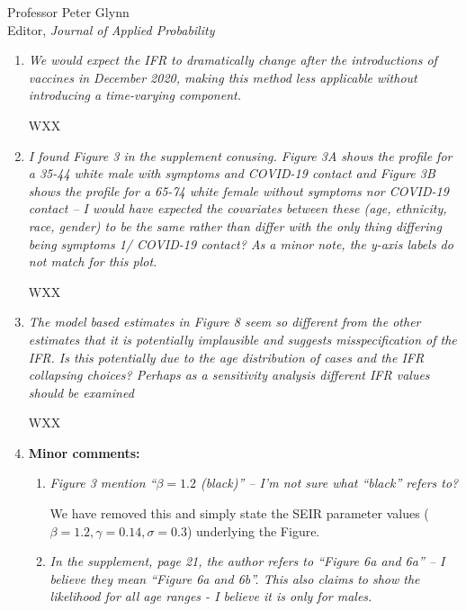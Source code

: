 \documentclass[11pt]{letter} %
\begin{document}
\begin{letter}{Professor
	Peter Glynn\\
	Editor, {\em Journal of Applied Probability}}
\begin{enumerate}
\vspace{5mm}
WXX
\vspace{5mm}
\item {\it We would expect the IFR to dramatically change after the introductions of vaccines in December 2020, making this method less applicable without introducing a time-varying component.}

\vspace{5mm}
WXX
\vspace{5mm}
\item {\it I found Figure 3 in the supplement conusing. Figure 3A shows the profile for a 35-44 white male with symptoms and COVID-19 contact and Figure 3B shows the profile for a 65-74 white female without symptoms nor COVID-19 contact – I would have expected the covariates between these (age, ethnicity, race, gender) to be the same rather than differ with the only thing differing being symptoms 1/ COVID-19 contact? As a minor note, the y-axis labels do not match for this plot.}

\vspace{5mm}
WXX
\vspace{5mm}
\item {\it The model based estimates in Figure 8 seem so different from the other estimates that it is potentially implausible and suggests misspecification of the IFR. Is this potentially due to the age distribution of cases and the IFR collapsing choices? Perhaps as a sensitivity analysis different IFR values should be examined}

\vspace{5mm}
WXX
\vspace{5mm}
\item {\bf Minor comments:}
	\begin{enumerate}
		\item {\it Figure 3 mention “$\beta = 1.2$ (black)” – I’m not sure what “black” refers to?}
		\vspace{5mm}

		We have removed this and simply state the SEIR parameter values ($\beta = 1.2, \gamma = 0.14, \sigma = 0.3$) underlying the Figure.

		\item {\it In the supplement, page 21, the author refers to “Figure 6a and 6a” – I believe they mean “Figure 6a and 6b”. This also claims to show the likelihood for all age ranges - I believe it is only for males.}
	\end{enumerate}
\end{enumerate}

\end{letter}
\end{document}
